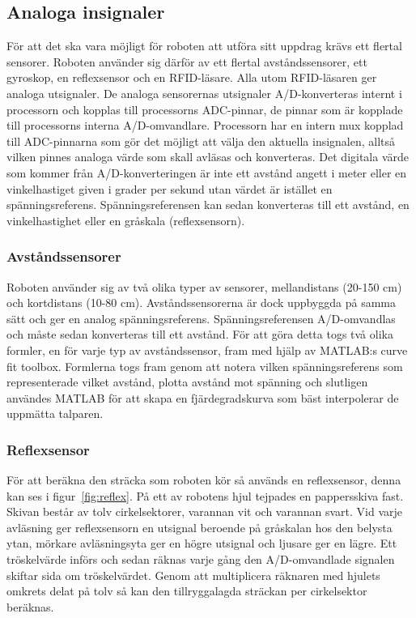 \documentclass[a4paper,12pt,fleqn]{article}
\begin{document}
\subsection{Analoga insignaler}
För att det ska vara möjligt för roboten att utföra sitt uppdrag krävs ett flertal sensorer. Roboten använder sig därför av ett flertal avståndssensorer, ett gyroskop, en reflexsensor och en RFID-läsare. Alla utom RFID-läsaren ger analoga utsignaler. De analoga sensorernas utsignaler A/D-konverteras internt i processorn och kopplas till processorns ADC-pinnar, de pinnar som är kopplade till processorns  interna A/D-omvandlare. Processorn har en intern mux kopplad till ADC-pinnarna som gör det möjligt att välja den aktuella insignalen, alltså vilken pinnes analoga värde som skall avläsas och konverteras. Det digitala värde som kommer från A/D-konverteringen är inte ett avstånd angett i meter eller en vinkelhastiget given i grader per sekund utan värdet är istället en spänningsreferens. Spänningsreferensen kan sedan konverteras till ett avstånd, en vinkelhastighet eller en gråskala (reflexsensorn).

\subsubsection{Avståndssensorer}
Roboten använder sig av två olika typer av sensorer, mellandistans (20-150 cm) och kortdistans (10-80 cm). Avståndssensorerna är dock uppbyggda på samma sätt och ger en analog spänningsreferens. Spänningsreferensen A/D-omvandlas och måste sedan konverteras till ett avstånd. För att göra detta togs två olika formler, en för varje typ av avståndssensor, fram med hjälp av MATLAB:s curve fit toolbox. Formlerna togs fram genom att notera vilken spänningsreferens som representerade vilket avstånd, plotta avstånd mot spänning och slutligen användes MATLAB för att skapa en fjärdegradskurva som bäst interpolerar de uppmätta talparen.

\subsubsection{Reflexsensor}
För att beräkna den sträcka som roboten kör så används en reflexsensor, denna kan ses i figur~\ref{fig:reflex}. På ett av robotens hjul tejpades en pappersskiva fast. Skivan består av tolv cirkelsektorer, varannan vit och varannan svart. Vid varje avläsning ger reflexsensorn en utsignal beroende på gråskalan hos den belysta ytan, mörkare avläsningsyta ger en högre utsignal och ljusare ger en lägre. Ett tröskelvärde införs och sedan räknas varje gång den A/D-omvandlade signalen skiftar sida om tröskelvärdet. Genom att multiplicera räknaren med hjulets omkrets delat på tolv så kan den tillryggalagda sträckan per cirkelsektor beräknas.
\end{document}
